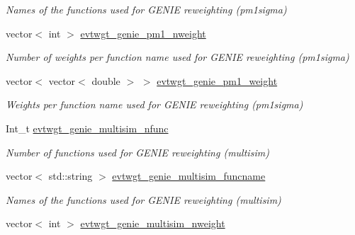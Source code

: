 \begin{DoxyCompactItemize}
\begin{DoxyCompactList}\small\item\em Names of the functions used for G\-E\-N\-I\-E reweighting (pm1sigma) \end{DoxyCompactList}\item 
\hypertarget{classUBXSecEvent_a9b6b8edd3e64dfff0120d2e194307b7f}{vector$<$ int $>$ \hyperlink{classUBXSecEvent_a9b6b8edd3e64dfff0120d2e194307b7f}{evtwgt\-\_\-genie\-\_\-pm1\-\_\-nweight}}\label{classUBXSecEvent_a9b6b8edd3e64dfff0120d2e194307b7f}

\begin{DoxyCompactList}\small\item\em Number of weights per function name used for G\-E\-N\-I\-E reweighting (pm1sigma) \end{DoxyCompactList}\item 
\hypertarget{classUBXSecEvent_acef1b142e2eabe6a190d840346100534}{vector$<$ vector$<$ double $>$ $>$ \hyperlink{classUBXSecEvent_acef1b142e2eabe6a190d840346100534}{evtwgt\-\_\-genie\-\_\-pm1\-\_\-weight}}\label{classUBXSecEvent_acef1b142e2eabe6a190d840346100534}

\begin{DoxyCompactList}\small\item\em Weights per function name used for G\-E\-N\-I\-E reweighting (pm1sigma) \end{DoxyCompactList}\item 
\hypertarget{classUBXSecEvent_a77e65a33491b9b3768861144b4fb8509}{Int\-\_\-t \hyperlink{classUBXSecEvent_a77e65a33491b9b3768861144b4fb8509}{evtwgt\-\_\-genie\-\_\-multisim\-\_\-nfunc}}\label{classUBXSecEvent_a77e65a33491b9b3768861144b4fb8509}

\begin{DoxyCompactList}\small\item\em Number of functions used for G\-E\-N\-I\-E reweighting (multisim) \end{DoxyCompactList}\item 
\hypertarget{classUBXSecEvent_a53971f258b5267ed6d045084e53761ca}{vector$<$ std\-::string $>$ \hyperlink{classUBXSecEvent_a53971f258b5267ed6d045084e53761ca}{evtwgt\-\_\-genie\-\_\-multisim\-\_\-funcname}}\label{classUBXSecEvent_a53971f258b5267ed6d045084e53761ca}

\begin{DoxyCompactList}\small\item\em Names of the functions used for G\-E\-N\-I\-E reweighting (multisim) \end{DoxyCompactList}\item 
\hypertarget{classUBXSecEvent_ad85ac167ef9b9579fc363d48c21e5c14}{vector$<$ int $>$ \hyperlink{classUBXSecEvent_ad85ac167ef9b9579fc363d48c21e5c14}{evtwgt\-\_\-genie\-\_\-multisim\-\_\-nweight}}\label{classUBXSecEvent_ad85ac167ef9b9579fc363d48c21e5c14}


\end{DoxyCompactItemize}
